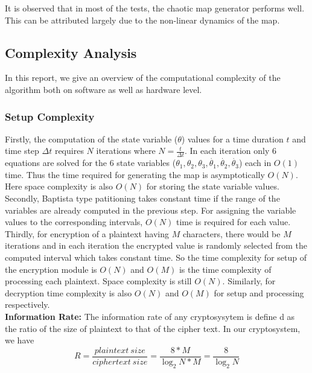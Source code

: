 \begin{itemize}
\begin{table}[h!]
\begin{center}
\begin{tabular}{|c|c|c|c|c|c|}
    \hline
\end{tabular}
\end{center}
\end{table}

It is observed that in most of the tests, the chaotic map generator performs well. This can be attributed largely due to the non-linear dynamics of the map.

\subsection{Complexity Analysis}

In this report, we give an overview of the computational complexity of the algorithm both on software as well as hardware level.

\subsubsection{Setup Complexity}
Firstly, the computation of the state variable (${\theta}$) values for a time duration $t$ and time step $\Delta t$ requires $N$ iterations where $N= \frac{t}{\Delta t}$. In each iteration only 6 equations are solved for the 6 state variables ($\theta_{1}, \theta_{2}, \theta_{3}, \dot{\theta_{1}}, \dot{\theta_{2}}, \dot{\theta_{3}}$) each in $O(1)$ time. Thus the time required for generating the map is asymptotically $O(N)$. Here space complexity is also $O(N)$ for storing the state variable values. Secondly, Baptista type patitioning takes constant time if the range of the variables are already computed in the previous step. For assigning the variable values to the corresponding intervals, $O(N)$ time is required for each value. Thirdly, for encryption of a plaintext having $M$ characters, there would be $M$ iterations and in each iteration the encrypted value is randomly selected from the computed interval which takes constant time. So the time complexity for setup of the encryption module is $O(N)$ and $O(M)$ is the time complexity of processing each plaintext. Space complexity is still $O(N)$. Similarly, for decryption time complexity is also $O(N)$ and $O(M)$ for setup and processing respectively.\\
\textbf{Information Rate:} The information rate of any cryptosysytem is define d as the ratio of the size of plaintext to that of the cipher text. In our cryptosystem, we have
\begin{equation}
R = \frac{plaintext\ size}{ciphertext\ size} = \frac{8*M}{\log_2N*M} = \frac{8}{\log_2N}
\end{equation}

\end{itemize}

